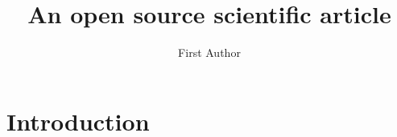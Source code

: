 \documentclass[twocolumn]{mnras}
\begin{document}
\title{An open source scientific article}

\author[0000-0000-0000-0000]{First Author}

\begin{abstract}
    \blindtext
\end{abstract}

\section{Introduction}
\Blindtext[4]
\end{document}

